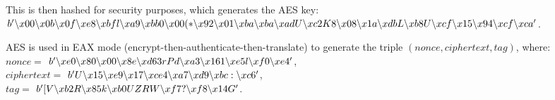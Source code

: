 \documentclass[12pt,a4paper]{article}
\begin{document}
This is then hashed for security purposes, which generates the AES key: \\
{\footnotesize $b' \char`\\x00 \char`\\x0b \char`\\x0f \char`\\xe8 \char`\\xbfl \char`\\xa9 \char`\\xbb0 \char`\\x00(* \char`\\x92 \char`\\x01 \char`\\xba \char`\\xba \\ 
\char`\\xadU \char`\\xc2K8 \char`\\x08 \char`\\x1a \char`\\xdbL \char`\\xb8U \char`\\xcf \char`\\x15 \char`\\x94 \char`\\xcf \char`\\xca '$}. 

AES is used in EAX mode (encrypt-then-authenticate-then-translate) to generate the triple $(nonce, ciphertext, tag)$, where: 
\vspace{1mm} \\
$nonce = $ {\footnotesize $b' \char`\\xe0 \char`\\x80 \char`\\x00 \char`\\x8e \char`\\xd63rPd \char`\\xa3 \char`\\x161 \char`\\xe5l \char`\\xf0 \char`\\xe4 '$}, \\
$ciphertext = $ {\footnotesize $b' U \char`\\x15 \char`\\xe9 \char`\\x17 \char`\\xce4 \char`\\xa7 \char`\\xd9 \char`\\xbc: \char`\\xc6 '$}, \\
$tag = $ {\footnotesize $b' [V \char`\\xb2R \char`\\x85k \char`\\xb0UZRW \char`\\xf7? \char`\\xf8 \char`\\x14G'$}. 
\end{document}
